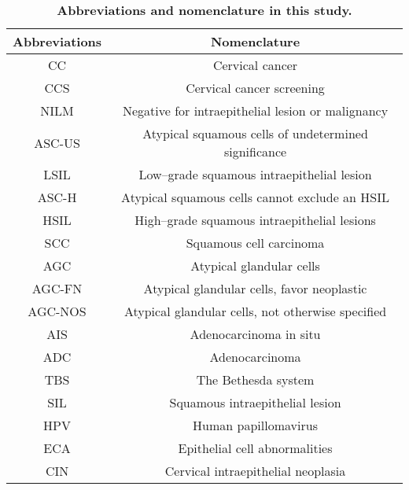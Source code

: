 \clearpage
\begin{table}[h] 
\renewcommand{\arraystretch}{1.5}
\renewcommand{\tablename}{Extended Data Table.}
\centering 
\caption{\textbf{Abbreviations and nomenclature in this study.}}
\begin{tabular}{c|c} 
\hline
\rowcolor{cusyellow} \textbf{Abbreviations} & \textbf{Nomenclature} \\ 
\hline
 CC & Cervical cancer \\ 
\rowcolor{cusyellowl} CCS & Cervical cancer screening \\ 
 NILM & Negative for intraepithelial lesion or malignancy \\ 
\rowcolor{cusyellowl} ASC-US & Atypical squamous cells of undetermined significance \\ 
 LSIL & Low–grade squamous intraepithelial lesion \\ 
\rowcolor{cusyellowl} ASC-H & Atypical squamous cells cannot exclude an HSIL \\ 
 HSIL & High–grade squamous intraepithelial lesions \\ 
\rowcolor{cusyellowl} SCC & Squamous cell carcinoma \\ 
 AGC & Atypical glandular cells \\ 
\rowcolor{cusyellowl} AGC-FN & Atypical glandular cells, favor neoplastic \\ 
 AGC-NOS & Atypical glandular cells, not otherwise specified \\ 
\rowcolor{cusyellowl} AIS & Adenocarcinoma in situ \\ 
 ADC & Adenocarcinoma \\ 
\rowcolor{cusyellowl} TBS & The Bethesda system \\ 
 SIL & Squamous intraepithelial lesion \\ 
\rowcolor{cusyellowl} HPV & Human papillomavirus \\ 
 ECA & Epithelial cell abnormalities \\ 
\rowcolor{cusyellowl} CIN & Cervical intraepithelial neoplasia \\ 
\hline 
\end{tabular} 
\label{ST_abb}
\end{table}



